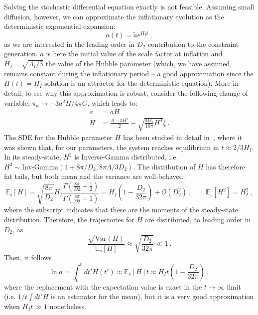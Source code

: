 \documentclass[amsmath,amssymb,11pt]{article}
\begin{document}
Solving the stochastic differential equation exactly is not feasible. Assuming small diffusion, however, we can approximate the inflationary evolution as the deterministic exponential expansion:
\begin{equation}
    a(t) = \tilde{a} e^{H_I t} \ ,
\end{equation}
as we are interested in the leading order in $D_2$ contribution to the constraint generation. $\tilde{a}$ is here the initial value of the scale factor at inflation and $H_I = \sqrt{\Lambda_I/3}$ the value of the Hubble parameter (which, we have assumed, remains constant during the inflationary period -- a good approximation since the $H(t)=H_I$ solution is an attractor for the deterministic equation). More in detail, to see why this approximation is robust, consider the following change of variable: $\pi_a \to - 3a^2H/4\pi G$, which leads to:
\begin{align}
    \dot{a} &= aH \\
    \dot{H} &= \frac{\Lambda-3H^2}{2}-\sqrt{\frac{3 D_2}{16 \pi}H^3} \bar{\xi}  \ .
\end{align}
The SDE for the Hubble parameter $H$ has been studied in detail in~\cite{bishop2019onedimensional}, where it was shown that, for our parameters, the system reaches equilibrium in $t\approx2/3H_I$. In its steady-state, $H^2$ is Inverse-Gamma distributed, i.e. $H^2\sim\textrm{Inv-Gamma}(1+8\pi/D_2,8\pi \Lambda/3D_2)$. The distribution of $H$ has therefore fat tails, but both mean and the variance are well-behaved:
\begin{equation}
    \mathbb{E}_{s}[H] = \sqrt{\frac{8\pi}{D_2}}H_I \frac{\Gamma\left(\frac{8\pi}{D2}+\frac{1}{2}\right)}{\Gamma\left(\frac{8\pi}{D2}+1\right)}=H_I \left(1-\frac{D_2}{32\pi}\right)+ \mathcal{O}(D_2^2) \ , \qquad \mathbb{E}_{s}[H^2] = H_I^2 \ , 
\end{equation}
where the subscript indicates that these are the moments of the steady-state distribution. Therefore, the trajectories for $H$ are distributed, to leading order in $D_2$, as
\begin{equation}
    \frac{\sqrt{\mathrm{Var}(H)}}{\mathbb{E}_s[H]} \approx \sqrt{\frac{D_2}{32\pi}} \ll 1 \ .
\end{equation}
Then, it follows
\begin{equation}
    \ln a = \int_0^t dt' H(t') \approx \mathbb{E}_s[H] t \approx H_I t \left(1-\frac{D_2}{32\pi}\right) \ ,
\end{equation}
where the replacement with the expectation value is exact in the $t\to\infty$ limit (i.e. $1/t \int dt' H$ is an estimator for the mean), but it is a very good approximation when $H_I t\gg1$ nonetheless.
\end{document}
